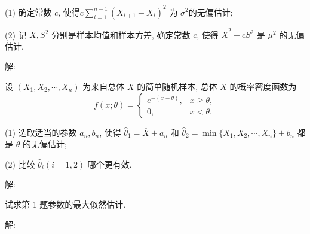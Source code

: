 \documentclass[standard]{ExBook}
\begin{document}
\begin{qitems}
\begin{bbox}
\begin{shaded}
(1) 确定常数 \(c\), 使得\(c \displaystyle\sum\limits_{i=1}^{n-1} (X_{i+1} - X_i)^2\) 为 \(\sigma^2\)的无偏估计;

(2) 记 \(\overline{X}, S^2\) 分别是样本均值和样本方差, 确定常数 \(c\), 使得 \(\overline{X}^2 - cS^2\) 是 \(\mu^2\) 的无偏估计.
    \end{shaded}
    \end{bbox}

\vspace{-5em}

    \begin{bbox}
解: 
    \end{bbox}

\vspace{-5em}

    \begin{bbox}
    \begin{shaded}
        \qitem
设 \((X_1, X_2, \cdots, X_n)\) 为来自总体 \(X\) 的简单随机样本, 总体 \(X\) 的概率密度函数为
\[f(x;\theta) = 
\begin{cases} 
e^{-(x-\theta)}, & x \geq \theta, \\
0, & x < \theta.
\end{cases}\]

(1) 选取适当的参数 \(a_n, b_n\), 使得 \(\hat{\theta}_1 = \overline{X} + a_n\) 和 \(\hat{\theta}_2 = \min\{X_1, X_2, \cdots, X_n\} + b_n\) 都是 \(\theta\) 的无偏估计;

(2) 比较 \(\hat{\theta}_i(i=1,2)\) 哪个更有效.
    \end{shaded}
    \end{bbox}

\vspace{-5em}

    \begin{bbox}
解: 
    \end{bbox}

\vspace{-5em}

    \begin{bbox}
    \begin{shaded}
        \qitem
试求第 1 题参数的最大似然估计.
    \end{shaded}
    \end{bbox}

\vspace{-5em}

    \begin{bbox}
解: 
    \end{bbox}

\vspace{-5em}


\end{qitems}
\end{document}
